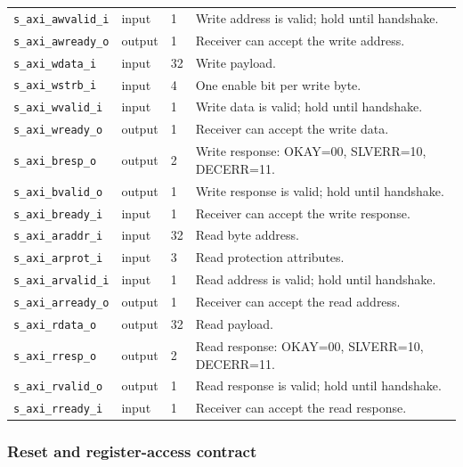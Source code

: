 \documentclass[11pt]{article}
\begin{document}
{\begin{longtable}{@{}L{0.3400\dimexpr\linewidth-36pt\relax}L{0.1000\dimexpr\linewidth-36pt\relax}L{0.1000\dimexpr\linewidth-36pt\relax}L{0.4600\dimexpr\linewidth-36pt\relax}@{}}
\texttt{s\_axi\_awvalid\_i} & input & 1 & Write address is valid; hold until handshake. \\ \addlinespace[3pt]
\texttt{s\_axi\_awready\_o} & output & 1 & Receiver can accept the write address. \\ \addlinespace[3pt]
\texttt{s\_axi\_wdata\_i} & input & 32 & Write payload. \\ \addlinespace[3pt]
\texttt{s\_axi\_wstrb\_i} & input & 4 & One enable bit per write byte. \\ \addlinespace[3pt]
\texttt{s\_axi\_wvalid\_i} & input & 1 & Write data is valid; hold until handshake. \\ \addlinespace[3pt]
\texttt{s\_axi\_wready\_o} & output & 1 & Receiver can accept the write data. \\ \addlinespace[3pt]
\texttt{s\_axi\_bresp\_o} & output & 2 & Write response: OKAY=00, SLVERR=10, DECERR=11. \\ \addlinespace[3pt]
\texttt{s\_axi\_bvalid\_o} & output & 1 & Write response is valid; hold until handshake. \\ \addlinespace[3pt]
\texttt{s\_axi\_bready\_i} & input & 1 & Receiver can accept the write response. \\ \addlinespace[3pt]
\texttt{s\_axi\_araddr\_i} & input & 32 & Read byte address. \\ \addlinespace[3pt]
\texttt{s\_axi\_arprot\_i} & input & 3 & Read protection attributes. \\ \addlinespace[3pt]
\texttt{s\_axi\_arvalid\_i} & input & 1 & Read address is valid; hold until handshake. \\ \addlinespace[3pt]
\texttt{s\_axi\_arready\_o} & output & 1 & Receiver can accept the read address. \\ \addlinespace[3pt]
\texttt{s\_axi\_rdata\_o} & output & 32 & Read payload. \\ \addlinespace[3pt]
\texttt{s\_axi\_rresp\_o} & output & 2 & Read response: OKAY=00, SLVERR=10, DECERR=11. \\ \addlinespace[3pt]
\texttt{s\_axi\_rvalid\_o} & output & 1 & Read response is valid; hold until handshake. \\ \addlinespace[3pt]
\texttt{s\_axi\_rready\_i} & input & 1 & Receiver can accept the read response. \\*
\bottomrule\end{longtable}}

\subsubsection{Reset and register-access contract}
\end{document}

